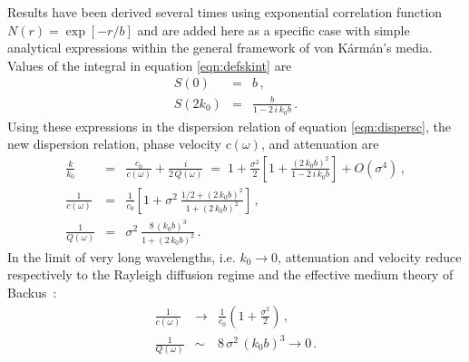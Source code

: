 Results have been derived several times \cite[]{Karal_K64,Sato_F98} 
using exponential correlation function
$N(r)=\exp[-r/b]$ and are added here as a specific case
with simple analytical expressions within the general framework of von K\'arm\'an's media.
Values of the integral in equation \ref{eqn:defskint} are
\begin{eqnarray}
S(0) & = & b\,,\\
S(2k_0) & = & \frac{b}{1-2\,i\,k_0b}\,.
\end{eqnarray}
Using these expressions in the dispersion relation of equation \ref{eqn:dispersc}, the new dispersion relation, phase velocity $c(\omega)$, and attenuation are
\begin{eqnarray}
\frac{k}{k_0} & = & \frac{c_0}{c(\omega)} + \frac{i}{2\,Q(\omega)} \; = \; 1 + \frac{\sigma^2}{2}\left[1 + \frac{(2\,k_0b)^2}{1-2\,i\,k_0b}\right] + O(\sigma^4)\,,  \\
\frac{1}{c(\omega)} & = & \frac{1}{c_0}
\left[1+\sigma^2~\frac{1/2+(2\,k_0b)^2}{1+(2\,k_0b)^2}\right]\,, \label{eqn:vdispe1} \\
\frac{1}{Q(\omega)} & = & \sigma^2~\frac{8\,(k_0b)^3}{1+(2\,k_0b)^2}\,. \label{eqn:vqe1}
\end{eqnarray}
In the limit of very long wavelengths, i.e. $k_0\rightarrow 0$, attenuation and velocity reduce respectively to the Rayleigh diffusion regime 
and the effective medium theory of Backus \,:
\begin{eqnarray}
\frac{1}{c(\omega)} & \rightarrow & \frac{1}{c_0}\left(1+\frac{\sigma^2}{2}\right)\,,\\
\frac{1}{Q(\omega)} & \sim & 8\,\sigma^2\,(k_0b)^3 \rightarrow 0\,.
\end{eqnarray}




%
